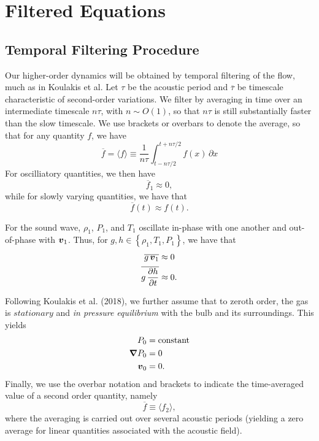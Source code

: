 \section{Filtered Equations}
\subsection{Temporal Filtering Procedure}
Our higher-order dynamics will be obtained by temporal filtering of the flow, much as in Koulakis et al.   Let $\tau$ be the acoustic period and $\overline{\tau}$ be timescale characteristic of second-order variations.   We filter by averaging in time over an intermediate timescale $n\tau$, with $n\sim O(1)$, so that $n\tau$ is still substantially faster than the slow timescale.  We use brackets or overbars to denote the average, so that for any quantity $f$, we have
\begin{equation}
\overline{f} = \langle f \rangle \equiv \frac{1}{n\tau}\int_{t-n\tau/2}^{t+n\tau/2} f(x)\, \partial x
\end{equation}
For oscilliatory quantities, we then have
\begin{equation}
\overline{f}_1 \approx 0,
\end{equation}
while for slowly varying quantities, we have that
\begin{equation}
\overline{f}(t) \approx f(t).
\end{equation}

For the sound wave, $\rho_1$, $P_1$, and $T_1$ oscillate in-phase with one another and out-of-phase with $\boldsymbol{v}_1$.  Thus, for $g,h \in \left\{\rho_1, T_1, P_1 \right\}$, we have that
\begin{align}
\overline{g\, \boldsymbol{v}_1} &\approx 0 \\  
\overline{g\, \frac{\partial h}{\partial t}} &\approx 0.
\end{align}

Following Koulakis et al. (2018), we further assume that to zeroth order, the gas is $stationary$ and \textit{in pressure equilibrium} with the bulb and its surroundings.  This yields
\begin{align}
P_0 &= \mathrm{constant} \\ 
\boldsymbol{\nabla} P_0 &= 0 \\
\boldsymbol{v}_0 &= 0.
\end{align}
Finally, we use the overbar notation and brackets to indicate the time-averaged value of a second order quantity, namely
\begin{equation}
\overline{f} \equiv \langle f_2 \rangle,
\end{equation}
where the averaging is carried out over several acoustic periods (yielding a zero average for linear quantities associated with the acoustic field).

